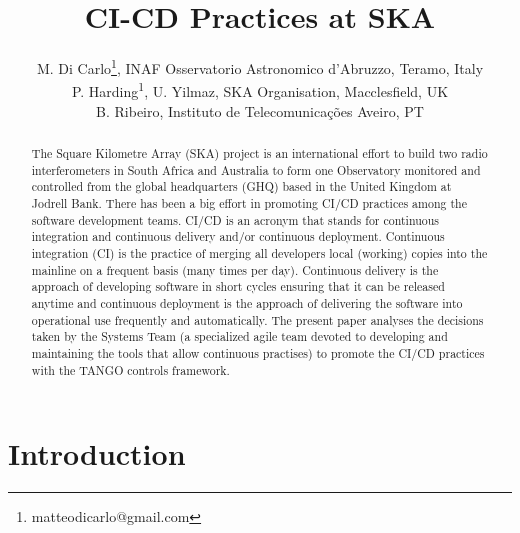 \documentclass[a4paper,
               keeplastbox,   %
               ]{jacow}
\begin{document}
\title{CI-CD Practices at SKA}

\author{M. Di Carlo\thanks{matteodicarlo@gmail.com}, INAF Osservatorio Astronomico d'Abruzzo, Teramo, Italy \\
        P. Harding\textsuperscript{1}, U. Yilmaz, SKA Organisation, Macclesfield, UK \\
        B. Ribeiro, Instituto de Telecomunicações Aveiro, PT}

\maketitle

\begin{abstract}
The Square Kilometre Array (SKA) project is an international effort to build two radio interferometers in South Africa and Australia to form one Observatory monitored and controlled from the global headquarters (GHQ) based in the United Kingdom at Jodrell Bank. There has been a big effort in promoting CI/CD practices among the software development teams. CI/CD is an acronym that stands for continuous integration and continuous delivery and/or continuous deployment. Continuous integration (CI) is the practice of merging all developers local (working) copies into the mainline on a frequent basis (many times per day). Continuous delivery is the approach of developing software in short cycles ensuring that it can be released anytime and continuous deployment is the approach of delivering the software into operational use frequently and automatically. The present paper analyses the decisions taken by the Systems Team (a specialized agile team devoted to developing and maintaining the tools that allow continuous practises) to promote the CI/CD practices with the TANGO controls framework.
\end{abstract}

\section{Introduction}
\label{sec:intro}  %
\end{document}
